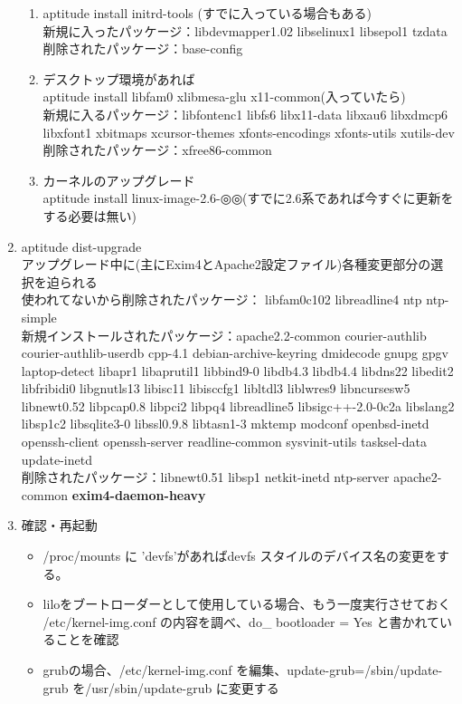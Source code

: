 \documentclass[mingoth,a4paper]{jsarticle}
\begin{document}
\begin{enumerate}
\begin{enumerate}
\item aptitude install initrd-tools (すでに入っている場合もある)\\
新規に入ったパッケージ：libdevmapper1.02 libselinux1 libsepol1 tzdata\\
削除されたパッケージ：base-config
\item デスクトップ環境があれば\\
aptitude install libfam0 xlibmesa-glu x11-common(入っていたら)\\
新規に入るパッケージ：libfontenc1 libfs6 libx11-data libxau6 libxdmcp6 libxfont1 xbitmaps xcursor-themes xfonts-encodings xfonts-utils xutils-dev\\
削除されたパッケージ：xfree86-common
\item カーネルのアップグレード\\
aptitude install linux-image-2.6-◎◎(すでに2.6系であれば今すぐに更新をする必要は無い)
\end{enumerate}
\item aptitude dist-upgrade\\
アップグレード中に(主にExim4とApache2設定ファイル)各種変更部分の選択を迫られる\\
使われてないから削除されたパッケージ： libfam0c102 libreadline4 ntp ntp-simple\\
新規インストールされたパッケージ：apache2.2-common courier-authlib courier-authlib-userdb cpp-4.1 debian-archive-keyring dmidecode gnupg gpgv laptop-detect libapr1 libaprutil1 libbind9-0 libdb4.3 libdb4.4 libdns22 libedit2 libfribidi0 libgnutls13 libisc11 libisccfg1 libltdl3 liblwres9 libncursesw5 libnewt0.52 libpcap0.8 libpci2 libpq4 libreadline5 libsigc++-2.0-0c2a libslang2 libsp1c2 libsqlite3-0 libssl0.9.8 libtasn1-3 mktemp modconf openbsd-inetd openssh-client openssh-server readline-common sysvinit-utils tasksel-data update-inetd\\
削除されたパッケージ：libnewt0.51 libsp1 netkit-inetd ntp-server apache2-common {\bf exim4-daemon-heavy}\\

\item 確認・再起動
\begin{itemize}
\item /proc/mounts に 'devfs'があればdevfs スタイルのデバイス名の変更をする。
\item liloをブートローダーとして使用している場合、もう一度実行させておく \\
 {/}etc/kernel-img.conf の内容を調べ、do\_{ }bootloader = Yes と書かれていることを確認
\item grubの場合、/etc/kernel-img.conf を編集、update-grub=/sbin/update-grub を/usr/sbin/update-grub に変更する
\end{itemize}
\end{enumerate}
\end{document}
